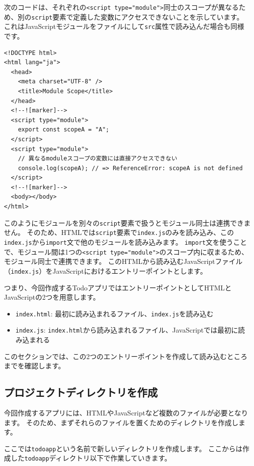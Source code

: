 次のコードは、それぞれの\texttt{<script type="module">}同士のスコープが異なるため、別の\texttt{script}要素で定義した変数にアクセスできないことを示しています。
これはJavaScriptモジュールをファイルにして\texttt{src}属性で読み込んだ場合も同様です。

\begin{lstlisting}
<!DOCTYPE html>
<html lang="ja">
  <head>
    <meta charset="UTF-8" />
    <title>Module Scope</title>
  </head>
  <!--![marker]-->
  <script type="module">
    export const scopeA = "A";
  </script>
  <script type="module">
    // 異なるmoduleスコープの変数には直接アクセスできない
    console.log(scopeA); // => ReferenceError: scopeA is not defined
  </script>
  <!--![marker]-->
  <body></body>
</html>
\end{lstlisting}

このようにモジュールを別々の\texttt{script}要素で扱うとモジュール同士は連携できません。
そのため、HTMLでは\texttt{script}要素で\texttt{index.js}のみを読み込み、この\texttt{index.js}から\texttt{import}文で他のモジュールを読み込みます。
\texttt{import}文を使うことで、モジュール間は1つの\texttt{<script type="module">}のスコープ内に収まるため、モジュール同士で連携できます。
このHTMLから読み込むJavaScriptファイル（\texttt{index.js}）をJavaScriptにおけるエントリーポイントとします。

つまり、今回作成するTodoアプリではエントリーポイントとしてHTMLとJavaScriptの2つを用意します。

\begin{itemize}
\item
  \texttt{index.html}:
  最初に読み込まれるファイル、\texttt{index.js}を読み込む
\item
  \texttt{index.js}:
  \texttt{index.html}から読み込まれるファイル、JavaScriptでは最初に読み込まれる
\end{itemize}

このセクションでは、この2つのエントリーポイントを作成して読み込むところまでを確認します。

\hypertarget{project-directory}{%
\subsection{プロジェクトディレクトリを作成}\label{project-directory}}

今回作成するアプリには、HTMLやJavaScriptなど複数のファイルが必要となります。
そのため、まずそれらのファイルを置くためのディレクトリを作成します。

ここでは\texttt{todoapp}という名前で新しいディレクトリを作成します。
ここからは作成した\texttt{todoapp}ディレクトリ以下で作業していきます。

